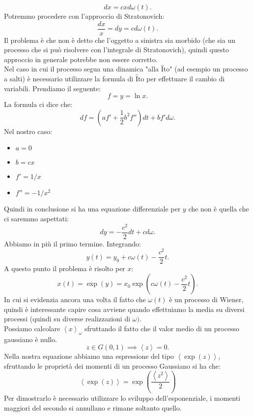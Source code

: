 \noindent
\begin{exmp}[]
    \[
	dx = cxd\omega (t) 
    .\] 
    Potremmo procedere con l'approccio di Stratonovich:
    \[
	\frac{dx}{x} = dy = cd\omega (t) 
    .\] 
    Il problema è che non è detto che l'oggetto a sinistra sia morbido (che sia un processo che si può risolvere con l'integrale di Stratonovich), quindi questo approccio in generale potrebbe non essere corretto.\\
    Nel caso in cui il processo segua una dinamica "alla $\hat{\text{I}}$to" (ad esempio un processo a salti) è necessario utilizzare la formula di $\hat{\text{I}}$to per effettuare il cambio di variabili. Prendiamo il seguente:
    \[
        f = y = \ln x
    .\] 
    La formula ci dice che:
    \[
        df = \left(af'+ \frac{1}{2}b^2f''\right)dt + bf'd\omega
    .\] 
    Nel nostro caso: 
    \begin{itemize}
        \item $a=0$ 
	\item $b = cx$
	\item $f' = 1 /x$ 
	\item $f'' = - 1/x^2$ 
    \end{itemize}
    Quindi in conclusione si ha una equazione differenziale per $y$ che non è quella che ci saremmo aspettati:
    \[
        dy = -\frac{c^2}{2}dt + cd\omega
    .\] 
    Abbiamo in più il primo termine. Integrando:
    \[
	y(t) = y_0 + c\omega(t) - \frac{c^2}{2}t
    .\] 
    A questo punto il problema è risolto per $x$:
    \[
	x(t) = \exp\left(y\right) = x_0\exp\left(c\omega (t) - \frac{c^2}{2}t\right)
    .\] 
    In cui si evidenzia ancora una volta il fatto che $\omega (t)$ è un processo di Wiener, quindi è interessante capire cosa avviene quando effettuiamo la media su diversi processi (quindi su diverse realizzazioni di $\omega )$.\\
    Possiamo calcolare $\left<x\right>_\omega$ sfruttando il fatto che il valor medio di un processo gaussiano è nullo.
    \[
	z \in G(0, 1) \implies  \left<z\right> = 0
    .\] 
    Nella nostra equazione abbiamo una espressione del tipo $\left<\exp (z)\right>$, sfruttando le proprietà dei momenti di un processo Gaussiano si ha che:
    \begin{equation}
	\left<\exp\left(z\right)\right> = \exp\left(\frac{\left<z^2\right>}{2}\right) \label{eq:8_gauss}
    \end{equation}
    Per dimostrarlo è necessario utilizzare lo sviluppo dell'esponenziale, i momenti maggiori del secondo si annullano e rimane soltanto quello.\\

\end{exmp}
